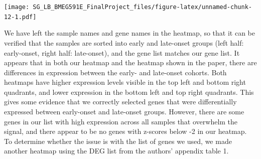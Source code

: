 \documentclass[
]{article}
\begin{document}
\texttt{[image: SG\_LB\_BMEG591E\_FinalProject\_files/figure-latex/unnamed-chunk-12-1.pdf]}

We have left the sample names and gene names in the heatmap, so that it
can be verified that the samples are sorted into early and late-onset
groups (left half: early-onset, right half: late-onset), and the gene
list matches our gene list. It appears that in both our heatmap and the
heatmap shown in the paper, there are differences in expression between
the early- and late-onset cohorts. Both heatmaps have higher expression
levels visible in the top left and bottom right quadrants, and lower
expression in the bottom left and top right quadrants. This gives some
evidence that we correctly selected genes that were differentially
expressed between early-onset and late-onset groups. However, there are
some genes in our list with high expression across all samples that
overwhelm the signal, and there appear to be no genes with z-scores
below -2 in our heatmap. To determine whether the issue is with the list
of genes we used, we made another heatmap using the DEG list from the
authors' appendix table 1.
\end{document}
